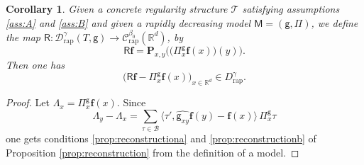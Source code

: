 \documentclass[11pt]{article}
\numberwithin{equation}{section}
\theoremstyle{plain}
\newtheorem{cor}[thm]{Corollary}
\theoremstyle{definition}
\newcommand{\bsf}{\boldsymbol{f}}
\newcommand{\rap}{\mathrm{rap}}
\newcommand{\bfP}{\mathbf{P}}
\newcommand{\reR}{\boldsymbol{\mathsf{R}}}
\newcommand{\sfM}{\mathsf{M}}
\newcommand{\sfg}{\mathsf{g}}
\newcommand{\sfPi}{\mathsf{\Pi}}
\newcommand{\scrT}{\mathscr{T}}
\newcommand{\bbR}{\mathbb{R}}
\newcommand{\mcB}{\mathcal{B}}
\newcommand{\mcC}{\mathcal{C}}
\newcommand{\mcD}{\mathcal{D}}
\begin{document}
\begin{cor}\label{canonical reconstruction}
Given a concrete regularity structure $\scrT$ satisfying assumptions \eqref{ass:A} and \eqref{ass:B} and given a rapidly decreasing model $\sfM=(\sfg,\sfPi)$, we define the map \hbox{$\reR : \mcD_\rap^\gamma(T,\sfg)\to \mcC_\rap^{\beta_0}(\bbR^d)$}, by
\[
\reR\bsf = \bfP_{x,y}\bigl(\bigl(\sfPi_x^\sfg\bsf(x)\bigr)(y)\bigr).
\]
Then one has
\[
\bigl(\reR\bsf-\sfPi_x^\sfg\bsf(x)\bigr)_{x\in\bbR^d} \in D_\rap^\gamma.
\]
\end{cor}

\begin{proof}
Let $\Lambda_x=\sfPi_x^\sfg\bsf(x)$. Since
\[
\Lambda_y-\Lambda_x = \sum_{\tau\in\mcB} \big\langle\tau',\widehat{\sfg_{xy}}\bsf(y)-\bsf(x)\big\rangle\,\sfPi_x^\sfg\tau
\]
one gets conditions \eqref{prop:reconstructiona} and \eqref{prop:reconstructionb} of Proposition \ref{prop:reconstruction} from the definition of a model.
\end{proof}
\end{document}
